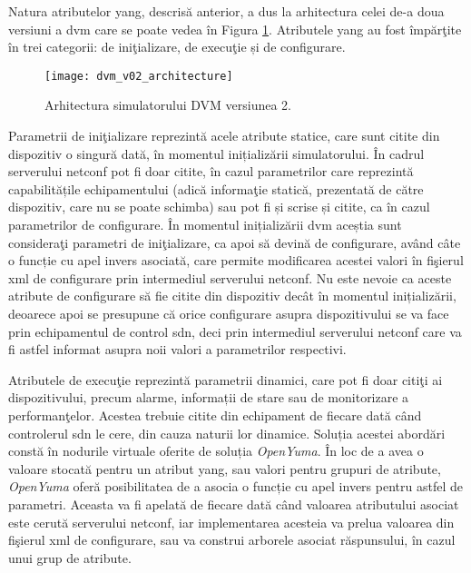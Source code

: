 Natura atributelor \gls{yang}, descrisă anterior, a dus la arhitectura celei de-a doua versiuni a \gls{dvm} care se poate vedea în Figura \ref{fig:dvm_v02_architecture}. Atributele \gls{yang} au fost împărţite în trei categorii: de iniţializare, de execuţie și de configurare.

\begin{figure}[h]
	\centering
	\texttt{[image: dvm\_v02\_architecture]}
	\caption{Arhitectura simulatorului DVM versiunea 2.}
	\label{fig:dvm_v02_architecture}
\end{figure}

Parametrii de iniţializare reprezintă acele atribute statice, care sunt citite din dispozitiv o singură dată, în momentul inițializării simulatorului. În cadrul serverului \gls{netconf} pot fi doar citite, în cazul parametrilor care reprezintă capabilitățile echipamentului (adică informaţie statică, prezentată de către dispozitiv, care nu se poate schimba) sau pot fi și scrise și citite, ca în cazul parametrilor de configurare. În momentul inițializării \gls{dvm} aceștia sunt consideraţi parametri de iniţializare, ca apoi să devină de configurare, având câte o funcție cu apel invers asociată, care permite modificarea acestei valori în fişierul \gls{xml} de configurare prin intermediul serverului \gls{netconf}. Nu este nevoie ca aceste atribute de configurare să fie citite din dispozitiv decât în momentul inițializării, deoarece apoi se presupune că orice configurare asupra dispozitivului se va face prin echipamentul de control \gls{sdn}, deci prin intermediul serverului \gls{netconf} care va fi astfel informat asupra noii valori a parametrilor respectivi.

Atributele de execuţie reprezintă parametrii dinamici, care pot fi doar citiţi ai dispozitivului, precum alarme, informații de stare sau de monitorizare a performanţelor. Acestea trebuie citite din echipament de fiecare dată când controlerul \gls{sdn} le cere, din cauza naturii lor dinamice. Soluția acestei abordări constă în nodurile virtuale oferite de soluția \textit{OpenYuma}. În loc de a avea o valoare stocată pentru un atribut \gls{yang}, sau valori pentru grupuri de atribute, \textit{OpenYuma} oferă posibilitatea de a asocia o funcție cu apel invers pentru astfel de parametri. Aceasta va fi apelată de fiecare dată când valoarea atributului asociat este cerută serverului \gls{netconf}, iar implementarea acesteia va prelua valoarea din fişierul \gls{xml} de configurare, sau va construi arborele asociat răspunsului, în cazul unui grup de atribute.

